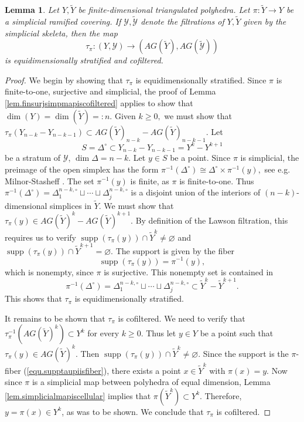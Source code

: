 \documentclass{amsart}
\newtheorem{lemma}[thm]{Lemma}
\theoremstyle{definition}
\theoremstyle{remark}
\newcommand {\Ya}    {\ensuremath{\mathcal{Y}}}
\newcommand {\supp}  {\ensuremath{\operatorname{supp}}}
\begin{document}
\begin{lemma} \label{lem.taupiequidimstratcofiltered}
Let $Y,\widetilde{Y}$ be finite-dimensional triangulated polyhedra.
Let $\pi: \widetilde{Y} \to Y$ be a simplicial ramified covering.
If $\Ya, \widetilde{\Ya}$ denote the filtrations of $Y,\widetilde{Y}$ given by
the simplicial skeleta, then the map 
\[ \tau_\pi: (Y,\Ya) \to 
  (AG(\widetilde{Y}), AG(\widetilde{\Ya})) \]
is equidimensionally stratified and cofiltered.
\end{lemma}
\begin{proof}
We begin by showing that $\tau_\pi$ is equidimensionally stratified.
Since $\pi$ is finite-to-one, surjective and simplicial,
the proof of Lemma \ref{lem.finsurjsimpmapiscofiltered}
applies to show that $\dim (Y) = \dim (\widetilde{Y}) =: n$.
Given $k\geq 0,$ we must show that
$\tau_\pi (Y_{n-k} - Y_{n-k-1}) \subset 
    AG(\widetilde{Y})_{n-k} - AG(\widetilde{Y})_{n-k-1}.$
Let 
\[ S=\Delta^\circ \subset Y_{n-k} - Y_{n-k-1} = Y^k - Y^{k+1} \]
be a stratum of $\Ya$, $\dim \Delta = n-k$.
Let $y\in S$ be a point.
Since $\pi$ is simplicial, the preimage of the open simplex has
the form
$\pi^{-1} (\Delta^\circ) \cong \Delta^\circ \times \pi^{-1} (y),$
see e.g. Milnor-Stasheff \cite[p. 236, Lemma 20.5]{milnorstasheff}.
The set $\pi^{-1} (y)$ is finite, as $\pi$ is finite-to-one.
Thus 
$\pi^{-1} (\Delta^\circ) = \Delta^{n-k,\circ}_1 \sqcup \cdots 
    \sqcup \Delta^{n-k,\circ}_j$
is a disjoint union of the interiors of $(n-k)$-dimensional simplices 
in $\widetilde{Y}$.
We must show that
$\tau_\pi (y) \in AG(\widetilde{Y})^k - AG(\widetilde{Y})^{k+1}.$
By definition of the Lawson filtration, this requires us to verify
$\supp (\tau_\pi (y)) \cap \widetilde{Y}^k \not= \varnothing$
and
$\supp (\tau_\pi (y)) \cap \widetilde{Y}^{k+1} = \varnothing.$
The support is given by the fiber
\begin{equation} \label{equ.supptaupiisfiber} 
\supp (\tau_\pi (y)) = \pi^{-1} (y), 
\end{equation}
which is nonempty, since $\pi$ is surjective.
This nonempty set is contained in
\[ \pi^{-1} (\Delta^\circ)
   = \Delta^{n-k,\circ}_1 \sqcup \cdots 
       \sqcup \Delta^{n-k,\circ}_j
       \subset \widetilde{Y}^k - \widetilde{Y}^{k+1}. \]
This shows that $\tau_\pi$ is equidimensionally stratified.

It remains to be shown that $\tau_\pi$ is cofiltered.
We need to verify that
$\tau^{-1}_\pi (AG(\widetilde{Y})^k) \subset Y^k$
for every $k\geq 0$.
Thus let $y\in Y$ be a point such that
$\tau_\pi (y) \in AG(\widetilde{Y})^k$.
Then
$\supp (\tau_\pi (y)) \cap \widetilde{Y}^k \not= \varnothing.$
Since the support is the $\pi$-fiber (\ref{equ.supptaupiisfiber}),
there exists a point $x\in \widetilde{Y}^k$ with $\pi (x)=y$.
Now since $\pi$ is a simplicial map between polyhedra of equal dimension,
Lemma \ref{lem.simplicialmapiscellular} implies that
$\pi (\widetilde{Y}^k) \subset Y^k.$
Therefore, $y=\pi (x) \in Y^k$, as was to be shown.
We conclude that $\tau_\pi$ is cofiltered.
\end{proof}
\end{document}
